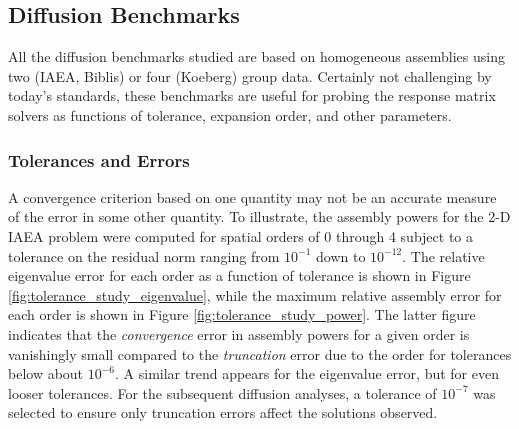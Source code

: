 \subsection{Diffusion Benchmarks}

All the diffusion benchmarks studied are based on homogeneous
assemblies using two (IAEA, Biblis) or four (Koeberg) group 
data.  Certainly not challenging by today's standards, these 
benchmarks are useful for probing the response matrix solvers
as functions of tolerance, expansion order, and other parameters.


\subsubsection{Tolerances and Errors}

A convergence criterion based on 
one quantity may not be an accurate measure of the error in some 
other quantity.  To illustrate, the assembly powers for the 2-D IAEA 
problem were computed for spatial orders of 0 through 4 subject to 
a tolerance on the residual norm ranging from $10^{-1}$ down to $10^{-12}$.
The relative eigenvalue error for each order as a function of 
tolerance is shown in Figure \ref{fig:tolerance_study_eigenvalue}, 
while the 
maximum relative assembly error for each order is shown in 
Figure \ref{fig:tolerance_study_power}.  The latter figure
indicates that the {\it convergence} error in assembly powers 
for a  given order is vanishingly small compared to 
the {\it truncation} error due to the order for tolerances
below about $10^{-6}$.  A similar trend appears for the eigenvalue 
error, but for even looser tolerances.  For the subsequent diffusion 
analyses, a tolerance of $10^{-7}$ was selected to ensure only 
truncation errors affect the solutions observed.


